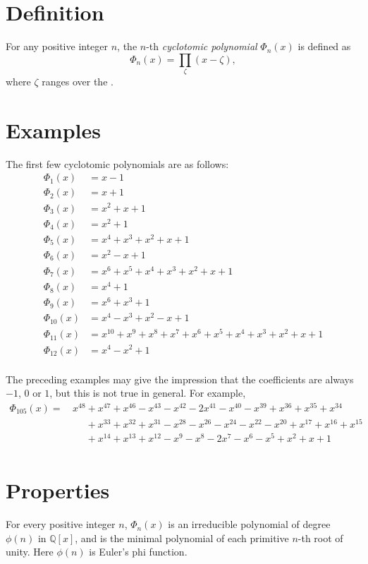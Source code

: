 \documentclass[12pt]{article}
\def\Q{\mathbb{Q}}
\begin{document}

\section*{Definition}

For any positive integer $n$,
the $n$-th {\em cyclotomic polynomial} $\Phi_n(x)$ is defined as
\[
  \Phi_n(x)=\prod_\zeta(x-\zeta),
\]
where $\zeta$ ranges over the
.

\section*{Examples}

The first few cyclotomic polynomials are as follows:
\begin{align*}
  \Phi_1(x)&=x-1 \\
  \Phi_2(x)&=x+1 \\
  \Phi_3(x)&=x^2+x+1 \\
  \Phi_4(x)&=x^2+1 \\
  \Phi_5(x)&=x^4+x^3+x^2+x+1 \\
  \Phi_6(x)&=x^2-x+1 \\
  \Phi_7(x)&=x^6+x^5+x^4+x^3+x^2+x+1 \\
  \Phi_8(x)&=x^4+1 \\
  \Phi_9(x)&=x^6+x^3+1 \\
  \Phi_{10}(x)&=x^4-x^3+x^2-x+1 \\
  \Phi_{11}(x)&=x^{10}+x^9+x^8+x^7+x^6+x^5+x^4+x^3+x^2+x+1 \\
  \Phi_{12}(x)&=x^4-x^2+1 \\
\end{align*}

The preceding examples may give the impression that the coefficients
are always $-1$, $0$ or $1$, but this is not true in general.
For example,
\begin{align*}
\Phi_{105}(x)=\,&x^{48}+x^{47}+x^{46}-x^{43}-x^{42}-2x^{41}-x^{40}-x^{39}+x^{36}+x^{35}+x^{34} \\
           &\phantom{x^{48}}+x^{33}+x^{32}+x^{31}-x^{28}-x^{26}-x^{24}-x^{22}-x^{20}+x^{17}+x^{16}+x^{15} \\
           &\phantom{x^{48}}+x^{14}+x^{13}+x^{12}-x^9-x^8-2x^7-x^6-x^5+x^2+x+1 \\
\end{align*}

\section*{Properties}

For every positive integer $n$,
$\Phi_n(x)$ is an irreducible polynomial of degree $\phi(n)$ in $\Q[x]$,
and is the minimal polynomial of each primitive $n$-th root of unity.
Here $\phi(n)$ is Euler's phi function.

\end{document}
